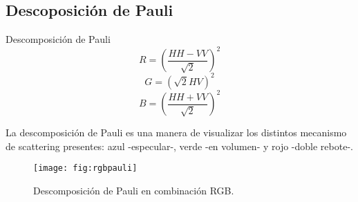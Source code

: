 
\subsection{Descoposición de Pauli}

\begin{frame}{} \vskip0cm
     \begin{block}{Descomposición de Pauli}
      \begin{equation}
        R = \left(\frac{HH-VV}{\sqrt{2}}\right)^2
      \end{equation}
      \begin{equation}
        G = \left(\sqrt{2}HV\right)^2
      \end{equation}
      \begin{equation}
        B = \left(\frac{HH+VV}{\sqrt{2}}\right)^2
      \end{equation}
     \end{block}
    La descomposición de Pauli es una manera de visualizar los distintos mecanismo de scattering presentes: azul -especular-, verde -en volumen- y rojo -doble rebote-.
\end{frame}

\begin{frame}{} \vskip0cm
  \begin{figure}
    \centering
    \texttt{[image: fig:rgbpauli]}
    \caption{Descomposición de Pauli en combinación RGB.}
    \label{}
  \end{figure}
\end{frame}

\gracias
